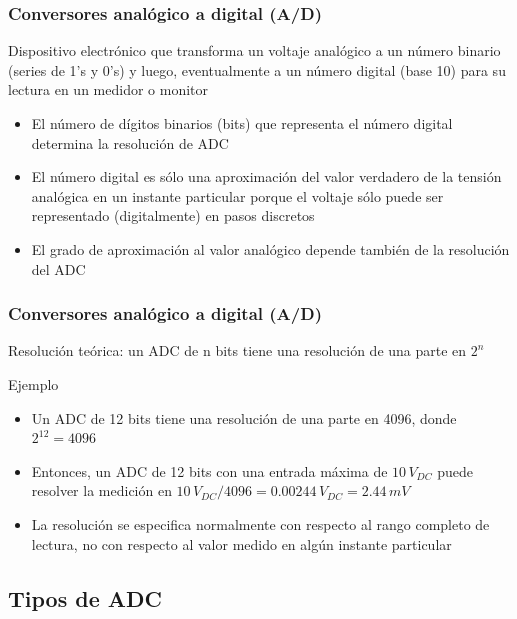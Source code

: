 \documentclass{beamer}
\begin{document}
\begin{frame}
\frametitle{Conversores analógico a digital (A/D)}
\begin{alertblock}{}
Dispositivo electrónico que transforma un voltaje analógico a un
número binario (series de 1's y 0's) y luego, eventualmente a un número digital
(base 10) para su lectura en un medidor o monitor 
\end{alertblock}
\begin{exampleblock}{}
\begin{itemize}
\item El número de dígitos binarios (bits) que representa el número digital
determina la resolución de ADC
\item El número digital es sólo una \alert{aproximación} del valor verdadero
de la tensión analógica en un instante particular porque el voltaje sólo
puede ser representado (digitalmente) en pasos discretos
\item El grado de aproximación al valor analógico depende también de la
resolución del ADC
\end{itemize}
\end{exampleblock}
\end{frame} 

\begin{frame}
\frametitle{Conversores analógico a digital (A/D)}
\begin{alertblock}{}
Resolución \alert{teórica}: un ADC de
{\color{blue} n} bits tiene una resolución de una parte en {\color{blue} $2^n$}
\end{alertblock}
\begin{exampleblock}{Ejemplo}
\begin{itemize}
\item Un ADC de 12 bits tiene una resolución de una parte en 4096, donde
$2^{12} = 4096$
\item Entonces, un ADC de 12 bits con una entrada máxima de $10\,V_{DC}$
puede resolver la medición en $10\,V_{DC}/4096 = 0.00244\,V_{DC} = 2.44\, mV$
\item {\color{blue} La resolución se especifica normalmente con respecto al rango completo
de lectura, no con respecto al valor medido en algún instante particular}
\end{itemize}
\end{exampleblock}
\end{frame} 

\subsection{Tipos de ADC}
\end{document}
